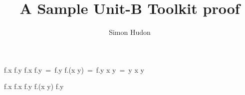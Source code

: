 \documentclass[12pt]{amsart}
\title{A Sample Unit-B Toolkit proof}
\author{Simon Hudon}
\date{} %
\newtheorem{theorem}{Theorem}
\begin{document}
\maketitle


\begin{calculation}
	f.x \le f.y
	f.x \uparrow f.y \,=\, f.y
	f.(x \uparrow y) \,=\, f.y
	x \uparrow y \,=\, y
	x \le y
\end{calculation}

\begin{calculation}
	f.x
	f.x \uparrow f.y
	f.(x \uparrow y)
	f.y
\end{calculation}

\end{document}
